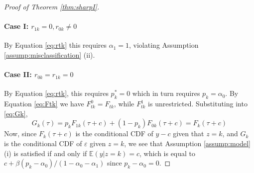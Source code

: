 \begin{proof}[Proof of Theorem \ref{thm:sharpI}]
\paragraph{Case I: $r_{1k} = 0, r_{0k} \neq 0$}
By Equation \ref{eq:rtk} this requires $\alpha_1 = 1$, violating Assumption \ref{assump:misclassification} (ii).

\paragraph{Case II: $r_{0k} = r_{1k} = 0$}
By Equation \ref{eq:rtk}, this requires $p_k^* = 0$ which in turn requires $p_k = \alpha_0$.
By Equation \ref{eq:Ftk} we have $F^0_{tk} = F_{tk}$, while $F^1_{tk}$ is unrestricted.
Substituting into \ref{eq:Gk},
\[
  G_k(\tau) = p_k F_{1k}(\tau + c) + (1 - p_k) F_{0k}(\tau + c) = F_k(\tau + c)
\]
Now, since $F_k(\tau + c)$ is the conditional CDF of $y-c$ given that $z=k$, and $G_k$ is the conditional CDF of $\varepsilon$ given $z=k$,
we see that Assumption \ref{assump:model} (i) is satisfied if and only if $\mathbb{E}(y|z=k) = c$, which is equal to $c + \beta(p_k - \alpha_0) / (1 - \alpha_0 - \alpha_1)$ since $p_k - \alpha_0 = 0$.


\end{proof}
